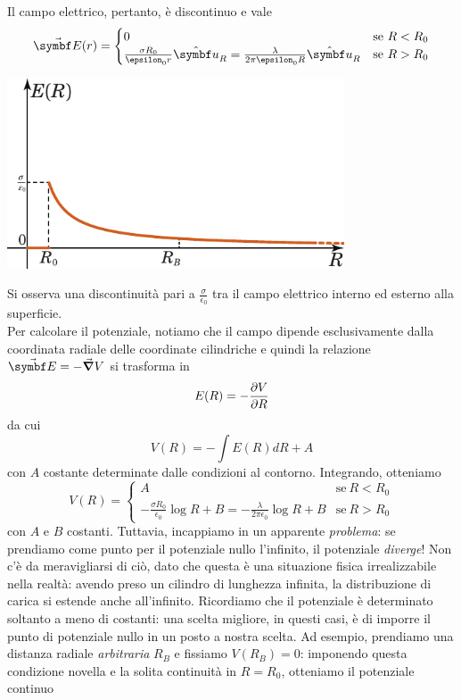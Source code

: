 Il campo elettrico, pertanto, è discontinuo e vale
\begin{equation}
	\vba{E}(r)=\begin{cases}
		0&\text{se}\ R< R_0\\
		\frac{\sigma R_0}{\epsilon_0r}\vbh{u}_R=\frac{\lambda}{2\pi\epsilon_0 R}\vbh{u}_R &\text{se}\ R> R_0
	\end{cases}
\end{equation}
\begin{center}
	\includegraphics[width=0.75\textwidth]{images/chp3/chp3cilindrograf1.pdf}
\end{center}
Si osserva una discontinuità pari a $\frac{\sigma}{\epsilon_0}$ tra il campo elettrico interno ed esterno alla superficie.\\
Per calcolare il potenziale, notiamo che il campo dipende esclusivamente dalla coordinata radiale delle coordinate cilindriche e quindi la relazione $\vba{E}=-\grad{V}$ si trasforma in
\begin{equation*}
	E(R)=-\pdv{V}{R}
\end{equation*}
da cui
\begin{equation*}
	V(R)=-\int E(R)dR+A
\end{equation*}
con $A$ costante determinate dalle condizioni al contorno. Integrando, otteniamo
\begin{equation*}
	V(R)=
	\begin{cases}
		A&\text{se}\ R< R_0\\
		-\frac{\sigma R_0}{\epsilon_0}\log R + B=-\frac{\lambda}{2\pi\epsilon_0}\log R + B&\text{se}\ R> R_0
	\end{cases}
\end{equation*}
con $A$ e $B$ costanti. Tuttavia, incappiamo in un apparente \textit{problema}: se prendiamo come punto per il potenziale nullo l'infinito, il potenziale \textit{diverge}! Non c'è da meravigliarsi di ciò, dato che questa è una situazione fisica irrealizzabile nella realtà: avendo preso un cilindro di lunghezza infinita, la distribuzione di carica si estende anche all'infinito. Ricordiamo che il potenziale è determinato soltanto a meno di costanti: una scelta migliore, in questi casi, è di imporre il punto di potenziale nullo in un posto a nostra scelta. Ad esempio, prendiamo una distanza radiale \textit{arbitraria} $R_{B}$ e fissiamo $V(R_B)=0$: imponendo questa condizione novella e la solita continuità in $R=R_0$, otteniamo il potenziale continuo
